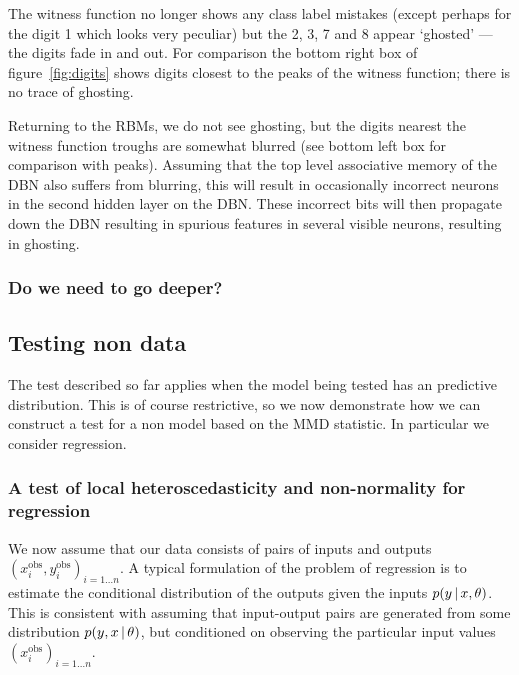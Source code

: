 \documentclass{article} %
\begin{document}
The witness function no longer shows any class label mistakes (except perhaps for the digit 1 which looks very peculiar) but the 2, 3, 7 and 8 appear `ghosted' --- the digits fade in and out.
For comparison the bottom right box of figure~\ref{fig:digits} shows digits closest to the peaks of the witness function; there is no trace of ghosting.

Returning to the RBMs, we do not see ghosting, but the digits nearest the witness function troughs are somewhat blurred (see bottom left box for comparison with peaks).
Assuming that the top level associative memory of the DBN also suffers from blurring, this will result in occasionally incorrect neurons in the second hidden layer on the DBN.
These incorrect bits will then propagate down the DBN resulting in spurious features in several visible neurons, resulting in ghosting.

\subsubsection{Do we need to go deeper?}


\subsection{Testing non \iid data}
\label{sec:non_iid}

The test described so far applies when the model being tested has an \iid predictive distribution.
This is of course restrictive, so we now demonstrate how we can construct a test for a non \iid model based on the MMD statistic.
In particular we consider regression.

\subsubsection{A test of local heteroscedasticity and non-normality for regression}


We now assume that our data consists of pairs of inputs and outputs ${(x_i^\textrm{obs}, y_i^\textrm{obs})_{i=1\ldots n}}$.
A typical formulation of the problem of regression is to estimate the conditional distribution of the outputs given the inputs ${p(y\,|\, x, \theta)}$.
This is consistent with assuming that input-output pairs are generated \iid from some distribution ${p(y, x \,|\, \theta)}$, but conditioned on observing the particular input values ${(x_i^\textrm{obs})_{i=1\ldots n}}$.
\end{document}
